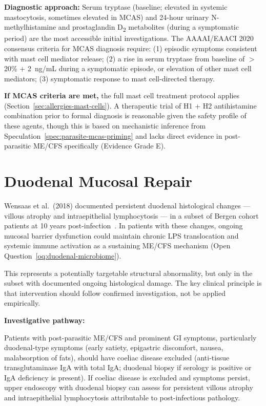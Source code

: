\textbf{Diagnostic approach:} Serum tryptase (baseline; elevated in systemic mastocytosis, sometimes elevated in MCAS) and 24-hour urinary N-methylhistamine and prostaglandin D\textsubscript{2} metabolites (during a symptomatic period) are the most accessible initial investigations. The AAAAI/EAACI 2020 consensus criteria for MCAS diagnosis require: (1) episodic symptoms consistent with mast cell mediator release; (2) a rise in serum tryptase from baseline of $>$20\% + 2~ng/mL during a symptomatic episode, or elevation of other mast cell mediators; (3) symptomatic response to mast cell-directed therapy.

\textbf{If MCAS criteria are met,} the full mast cell treatment protocol applies (Section~\ref{sec:allergies-mast-cells}). A therapeutic trial of H1 + H2 antihistamine combination prior to formal diagnosis is reasonable given the safety profile of these agents, though this is based on mechanistic inference from Speculation~\ref{spec:parasite-mcas-priming} and lacks direct evidence in post-parasitic ME/CFS specifically (Evidence Grade E).

\section{Duodenal Mucosal Repair}
\label{sec:duodenal-mucosal-repair}

Wensaas et al.\ (2018) documented persistent duodenal histological changes --- villous atrophy and intraepithelial lymphocytosis --- in a subset of Bergen cohort patients at 10 years post-infection~\cite{Wensaas2018giardia10yr}. In patients with these changes, ongoing mucosal barrier dysfunction could maintain chronic LPS translocation and systemic immune activation as a sustaining ME/CFS mechanism (Open Question~\ref{oq:duodenal-microbiome}).

This represents a potentially targetable structural abnormality, but only in the subset with documented ongoing histological damage. The key clinical principle is that intervention should follow confirmed investigation, not be applied empirically.

\textbf{Investigative pathway:}

Patients with post-parasitic ME/CFS and prominent GI symptoms, particularly duodenal-type symptoms (early satiety, epigastric discomfort, nausea, malabsorption of fats), should have coeliac disease excluded (anti-tissue transglutaminase IgA with total IgA; duodenal biopsy if serology is positive or IgA deficiency is present). If coeliac disease is excluded and symptoms persist, upper endoscopy with duodenal biopsy can assess for persistent villous atrophy and intraepithelial lymphocytosis attributable to post-infectious pathology.

